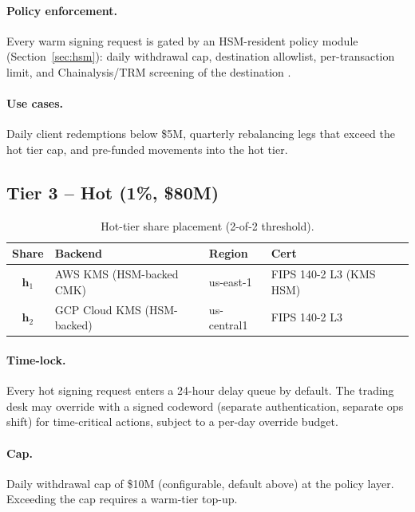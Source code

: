 \paragraph{Policy enforcement.} Every warm signing request is
gated by an HSM-resident policy module (Section~\ref{sec:hsm}):
daily withdrawal cap, destination allowlist, per-transaction limit,
and Chainalysis/TRM screening of the destination
\cite{chainalysis,trm}.

\paragraph{Use cases.} Daily client redemptions below \$5M, quarterly
rebalancing legs that exceed the hot tier cap, and pre-funded movements
into the hot tier.

\subsection{Tier 3 -- Hot (1\%, \$80M)}

\begin{table}[h]
\centering
\small
\begin{tabular}{cllll}
\toprule
\textbf{Share} & \textbf{Backend} & \textbf{Region} &
\textbf{Cert} \\
\midrule
$\mathbf{h}_1$ & AWS KMS (HSM-backed CMK) & us-east-1 &
  FIPS 140-2 L3 (KMS HSM) \\
$\mathbf{h}_2$ & GCP Cloud KMS (HSM-backed) & us-central1 &
  FIPS 140-2 L3 \\
\bottomrule
\end{tabular}
\caption{Hot-tier share placement (2-of-2 threshold).}
\label{tab:hot}
\end{table}

\paragraph{Time-lock.} Every hot signing request enters a 24-hour
delay queue by default. The trading desk may override with a signed
codeword (separate authentication, separate ops shift) for
time-critical actions, subject to a per-day override budget.

\paragraph{Cap.} Daily withdrawal cap of \$10M (configurable, default
above) at the policy layer. Exceeding the cap requires a warm-tier
top-up.

